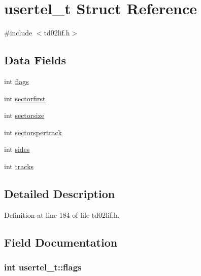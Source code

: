 \hypertarget{structusertel__t}{}\section{usertel\+\_\+t Struct Reference}
\label{structusertel__t}


{\ttfamily \#include $<$td02lif.\+h$>$}

\subsection*{Data Fields}
\begin{DoxyCompactItemize}
\item 
int \hyperlink{structusertel__t_a1cd7a10a44465477ff800cc599e4744f}{flags}
\item 
int \hyperlink{structusertel__t_ad81d010c171bf6f05db6c656d14529a3}{sectorfirst}
\item 
int \hyperlink{structusertel__t_a9f850738ca0fc170eb719a66a2342063}{sectorsize}
\item 
int \hyperlink{structusertel__t_a9a41e0e32661461716e600aa48b902c8}{sectorspertrack}
\item 
int \hyperlink{structusertel__t_a8add7bf3c4ef3422c8531c84c6f58129}{sides}
\item 
int \hyperlink{structusertel__t_afed111258495fd9c166720335613252f}{tracks}
\end{DoxyCompactItemize}


\subsection{Detailed Description}


Definition at line 184 of file td02lif.\+h.



\subsection{Field Documentation}
\subsubsection[{\texorpdfstring{flags}{flags}}]{\setlength{\rightskip}{0pt plus 5cm}int usertel\+\_\+t\+::flags}\hypertarget{structusertel__t_a1cd7a10a44465477ff800cc599e4744f}{}\label{structusertel__t_a1cd7a10a44465477ff800cc599e4744f}


